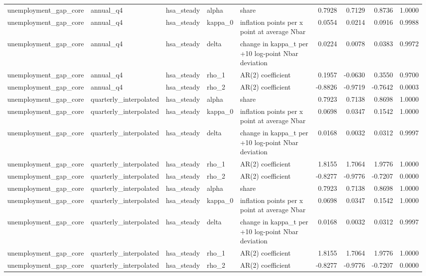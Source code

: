 \begin{tabular}{lllllrrrr}
unemployment\_gap\_core & annual\_q4 & hsa\_steady & alpha & share & 0.7928 & 0.7129 & 0.8736 & 1.0000 \\
unemployment\_gap\_core & annual\_q4 & hsa\_steady & kappa\_0 & inflation points per x point at average Nbar & 0.0554 & 0.0214 & 0.0916 & 0.9988 \\
unemployment\_gap\_core & annual\_q4 & hsa\_steady & delta & change in kappa\_t per +10 log-point Nbar deviation & 0.0224 & 0.0078 & 0.0383 & 0.9972 \\
unemployment\_gap\_core & annual\_q4 & hsa\_steady & rho\_1 & AR(2) coefficient & 0.1957 & -0.0630 & 0.3550 & 0.9700 \\
unemployment\_gap\_core & annual\_q4 & hsa\_steady & rho\_2 & AR(2) coefficient & -0.8826 & -0.9719 & -0.7642 & 0.0003 \\
unemployment\_gap\_core & quarterly\_interpolated & hsa\_steady & alpha & share & 0.7923 & 0.7138 & 0.8698 & 1.0000 \\
unemployment\_gap\_core & quarterly\_interpolated & hsa\_steady & kappa\_0 & inflation points per x point at average Nbar & 0.0698 & 0.0347 & 0.1542 & 1.0000 \\
unemployment\_gap\_core & quarterly\_interpolated & hsa\_steady & delta & change in kappa\_t per +10 log-point Nbar deviation & 0.0168 & 0.0032 & 0.0312 & 0.9997 \\
unemployment\_gap\_core & quarterly\_interpolated & hsa\_steady & rho\_1 & AR(2) coefficient & 1.8155 & 1.7064 & 1.9776 & 1.0000 \\
unemployment\_gap\_core & quarterly\_interpolated & hsa\_steady & rho\_2 & AR(2) coefficient & -0.8277 & -0.9776 & -0.7207 & 0.0000 \\
unemployment\_gap\_core & quarterly\_interpolated & hsa\_steady & alpha & share & 0.7923 & 0.7138 & 0.8698 & 1.0000 \\
unemployment\_gap\_core & quarterly\_interpolated & hsa\_steady & kappa\_0 & inflation points per x point at average Nbar & 0.0698 & 0.0347 & 0.1542 & 1.0000 \\
unemployment\_gap\_core & quarterly\_interpolated & hsa\_steady & delta & change in kappa\_t per +10 log-point Nbar deviation & 0.0168 & 0.0032 & 0.0312 & 0.9997 \\
unemployment\_gap\_core & quarterly\_interpolated & hsa\_steady & rho\_1 & AR(2) coefficient & 1.8155 & 1.7064 & 1.9776 & 1.0000 \\
unemployment\_gap\_core & quarterly\_interpolated & hsa\_steady & rho\_2 & AR(2) coefficient & -0.8277 & -0.9776 & -0.7207 & 0.0000 \\

\end{tabular}
